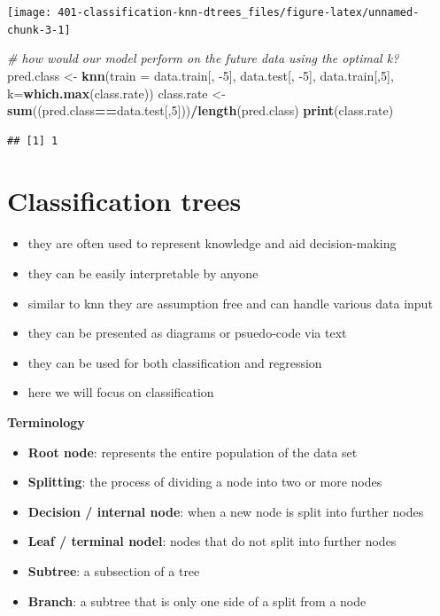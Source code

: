 \documentclass[
]{book}
\newenvironment{Shaded}{\begin{snugshade}}{\end{snugshade}}
\newcommand{\CommentTok}[1]{\textcolor[rgb]{0.56,0.35,0.01}{\textit{#1}}}
\newcommand{\DataTypeTok}[1]{\textcolor[rgb]{0.13,0.29,0.53}{#1}}
\newcommand{\DecValTok}[1]{\textcolor[rgb]{0.00,0.00,0.81}{#1}}
\newcommand{\KeywordTok}[1]{\textcolor[rgb]{0.13,0.29,0.53}{\textbf{#1}}}
\newcommand{\NormalTok}[1]{#1}
\newcommand{\OperatorTok}[1]{\textcolor[rgb]{0.81,0.36,0.00}{\textbf{#1}}}
\newcommand{\StringTok}[1]{\textcolor[rgb]{0.31,0.60,0.02}{#1}}
\providecommand{\tightlist}{%
  \setlength{\itemsep}{0pt}\setlength{\parskip}{0pt}}
\theoremstyle{definition}
\theoremstyle{definition}
\theoremstyle{definition}
\theoremstyle{remark}
\begin{document}
\begin{center}\texttt{[image: 401-classification-knn-dtrees\_files/figure-latex/unnamed-chunk-3-1]} \end{center}

\begin{Shaded}
\begin{Highlighting}[]
\CommentTok{\# how would our model perform on the future data using the optimal k?}
\NormalTok{pred.class \textless{}{-}}\StringTok{ }\KeywordTok{knn}\NormalTok{(}\DataTypeTok{train =}\NormalTok{ data.train[, }\DecValTok{{-}5}\NormalTok{], data.test[, }\DecValTok{{-}5}\NormalTok{], data.train[,}\DecValTok{5}\NormalTok{], }\DataTypeTok{k=}\KeywordTok{which.max}\NormalTok{(class.rate))}
\NormalTok{class.rate \textless{}{-}}\StringTok{ }\KeywordTok{sum}\NormalTok{((pred.class}\OperatorTok{==}\NormalTok{data.test[,}\DecValTok{5}\NormalTok{]))}\OperatorTok{/}\KeywordTok{length}\NormalTok{(pred.class)}
\KeywordTok{print}\NormalTok{(class.rate)}
\end{Highlighting}
\end{Shaded}

\begin{verbatim}
## [1] 1
\end{verbatim}

\hypertarget{classification-trees}{%
\section{Classification trees}\label{classification-trees}}

\begin{itemize}
\tightlist
\item
  they are often used to represent knowledge and aid decision-making
\item
  they can be easily interpretable by anyone
\item
  similar to knn they are assumption free and can handle various data input
\item
  they can be presented as diagrams or psuedo-code via text
\item
  they can be used for both classification and regression
\item
  here we will focus on classification
\end{itemize}

\textbf{Terminology}

\begin{itemize}
\tightlist
\item
  \textbf{Root node}: represents the entire population of the data set
\item
  \textbf{Splitting}: the process of dividing a node into two or more nodes
\item
  \textbf{Decision / internal node}: when a new node is split into further nodes
\item
  \textbf{Leaf / terminal nodel}: nodes that do not split into further nodes
\item
  \textbf{Subtree}: a subsection of a tree
\item
  \textbf{Branch}: a subtree that is only one side of a split from a node
\end{itemize}
\end{document}
